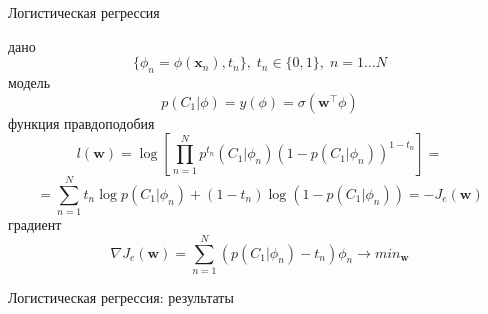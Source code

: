 \documentclass[10pt]{beamer}
\begin{document}
\begin{frame}{Логистическая регрессия}

дано
\[
\{\phi_n = \phi(\mathbf{x}_n), t_n\}, \; t_n \in \{ 0,1\}, \; n = 1 \ldots N
\]
модель
\[
p(C_1 | \phi) = y(\phi) = \sigma(\mathbf{w}^\top \phi)
\]
функция правдоподобия
\[
l(\mathbf{w}) = \log \left[ \prod_{n=1}^N p^{t_n}(C_1 | \phi_n) (1 - p(C_1 | \phi_n))^{1 - t_n}\right] = 
\]
\[
= \sum_{n=1}^N {t_n \log p(C_1 | \phi_n) + (1- t_n) \log (1 - p(C_1 | \phi_n))} = - J_e(\mathbf{w}) 
\]
градиент
\[
\nabla J_e(\mathbf{w}) = \sum_{n=1}^N (p(C_1 | \phi_n) - t_n) \phi_n \rightarrow min_{\mathbf{w}}
\]

\end{frame}


\begin{frame}{Логистическая регрессия: результаты}


\end{frame}
\end{document}
